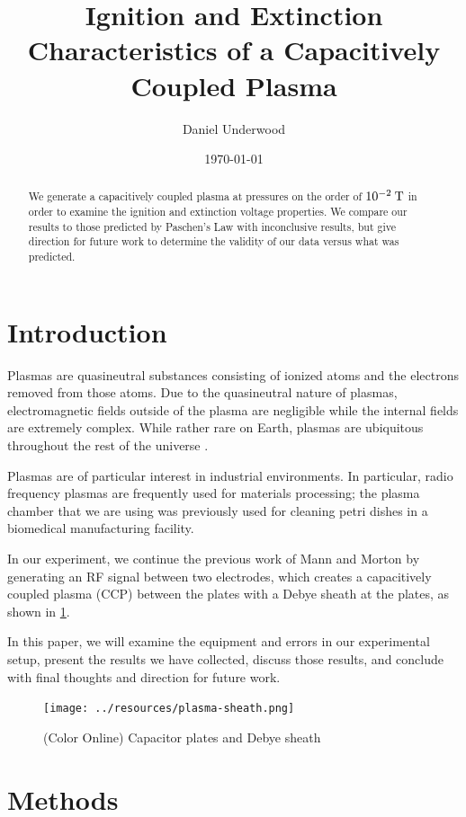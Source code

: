 \documentclass[reprint]{revtex4-1}
\begin{document}
\title{Ignition and Extinction Characteristics of a Capacitively Coupled Plasma}
\author{Daniel Underwood}
\date{\today}

\begin{abstract}
We generate a capacitively coupled plasma at pressures on the order of $10^{-2}\:\rm{T}$ in order to examine the ignition and extinction voltage properties. We compare our results to those predicted by Paschen's Law with inconclusive results, but give direction for future work to determine the validity of our data versus what was predicted.
\end{abstract}
\maketitle

\section{Introduction}
Plasmas are quasineutral substances consisting of ionized atoms and the electrons removed from those atoms. Due to the quasineutral nature of plasmas, electromagnetic fields outside of the plasma are negligible while the internal fields are extremely complex. While rather rare on Earth, plasmas are ubiquitous throughout the rest of the universe \cite{F.F.Chen1989}.

Plasmas are of particular interest in industrial environments. In particular, radio frequency plasmas are frequently used for materials processing; the plasma chamber that we are using was previously used for cleaning petri dishes in a biomedical manufacturing facility.

In our experiment, we continue the previous work of Mann and Morton \cite{Mann2015} by generating an RF signal between two electrodes, which creates a capacitively coupled plasma (CCP) between the plates with a Debye sheath at the plates, as shown in \cref{fig:plasma-sheath}.

In this paper, we will examine the equipment and errors in our experimental setup, present the results we have collected, discuss those results, and conclude with final thoughts and direction for future work.

\begin{figure}
\texttt{[image: ../resources/plasma-sheath.png]}
\caption{(Color Online) Capacitor plates and Debye sheath}
\label{fig:plasma-sheath}
\end{figure}

\section{Methods}
\end{document}

